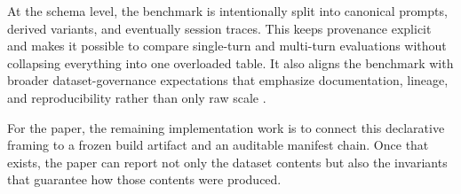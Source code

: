 At the schema level, the benchmark is intentionally split into canonical prompts, derived variants, and eventually session traces. This keeps provenance explicit and makes it possible to compare single-turn and multi-turn evaluations without collapsing everything into one overloaded table. It also aligns the benchmark with broader dataset-governance expectations that emphasize documentation, lineage, and reproducibility rather than only raw scale \citep{gebru2021datasheets}.

For the paper, the remaining implementation work is to connect this declarative framing to a frozen build artifact and an auditable manifest chain. Once that exists, the paper can report not only the dataset contents but also the invariants that guarantee how those contents were produced.
